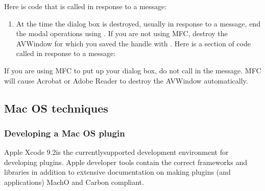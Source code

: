 \documentclass[letterpaper,12pt,english,openany,oneside]{sphinxmanual}
\begin{document}
Here is code that is called in response to a  message:

\begin{sphinxVerbatim}[commandchars=\\\{\}]
  
           
     
  
\end{sphinxVerbatim}
\begin{enumerate}
%
\setcounter{enumi}{2}
\item {} 
At the time the dialog box is destroyed, usually in response to a  message, end the modal operations using . If you are not using MFC, destroy the AVWindow for which you saved the handle with . Here is a section of code called in response to a  message:

\end{enumerate}

\begin{sphinxVerbatim}[commandchars=\\\{\}]
\end{sphinxVerbatim}

If you are using MFC to put up your dialog box, do not call  in the  message. MFC will cause Acrobat or Adobe Reader to destroy the AVWindow automatically.


\subsection{Mac OS techniques}
\label{\detokenize{Plugins_CreatingSimplePlug:mac-os-techniques}}

\subsubsection{Developing a Mac OS plugin}
\label{\detokenize{Plugins_CreatingSimplePlug:developing-a-mac-os-plugin}}
Apple Xcode 9.2is the currently\sphinxhyphen{}supported development environment for developing plugins. Apple developer tools contain the correct frameworks and libraries in addition to extensive documentation on making plugins (and applications) Mach\sphinxhyphen{}O and Carbon compliant.
\end{document}
